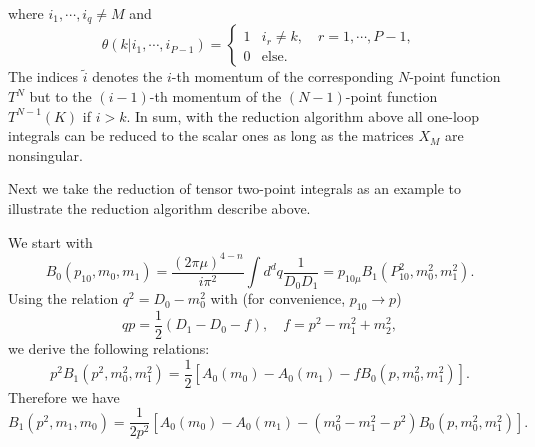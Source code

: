 where $i_1,\cdots,i_q\neq M$ and
\begin{equation}
\theta(k|i_1,\cdots,i_{P-1})=
\begin{cases}
1 & i_r\neq k, \quad r=1,\cdots,P-1,\\
0 & \text{else}.
\end{cases}
\end{equation}
The indices $\tilde{i}$ denotes the $i$-th momentum of the corresponding $N$-point function $T^N$ but to the $(i-1)$-th momentum of the $(N-1)$-point function $T^{N-1}(K)$ if $i>k$. In sum, with the reduction algorithm above all one-loop integrals can be reduced to the scalar ones as long as  the matrices $X_M$ are nonsingular.

Next we take the reduction of tensor two-point integrals as an example to illustrate the reduction algorithm describe above.

We start with 
\begin{equation}
B_0(p_{10},m_0,m_1)=\frac{{(2\pi\mu)}^{4-n}}{i\pi^2}\int d^d q\frac{1}{D_0 D_1}=p_{10\mu}B_1(P^2_{10},m^2_0,m_1^2).
\end{equation}
Using the relation $q^2=D_0-m_0^2$ with (for convenience, $p_{10}\to p$)
\begin{equation}
qp=\frac{1}{2}(D_1-D_0-f), \quad f=p^2-m_1^2+m_2^2,
\end{equation}
we derive the following relations:
\begin{equation}
p^2B_1(p^2,m_0^2,m_1^2)=\frac{1}{2}[A_0(m_0)-A_0(m_1)-fB_0(p,m_0^2,m_1^2)].
\end{equation}
Therefore we have
\begin{equation}
B_1(p^2,m_1,m_0)=\frac{1}{2p^2}[A_0(m_0)-A_0(m_1)-(m_0^2-m_1^2-p^2)B_0(p,m_0^2,m_1^2)].
\end{equation}



